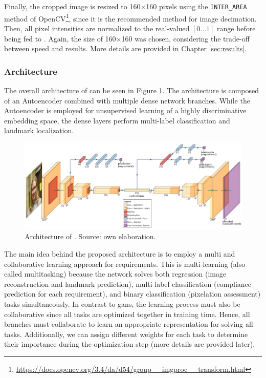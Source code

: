 Finally, the cropped image is resized to 160$\times$160 pixels using the \texttt{INTER\_AREA} method of OpenCV\footnote{\url{https://docs.opencv.org/3.4/da/d54/group__imgproc__transform.html}}, since it is the recommended method for image decimation. Then, all pixel intensities are normalized to the real-valued $[0...1]$ range before being fed to \methodname. Again, the size of 160$\times$160 was chosen, considering the trade-off between speed and results. More details are provided in Chapter \ref{sec:results}. 
 
\subsubsection{Architecture}
 
The overall architecture of \methodname can be seen in Figure \ref{fig:icaonet}. The architecture is composed of an Autoencoder combined with multiple dense network branches. While the Autoencoder is employed for unsupervised learning of a highly discriminative embedding space, the dense layers perform multi-label classification and landmark localization.
 
\begin{figure}[tb]
\centering
\includegraphics[width=\linewidth]{images/icaonet/icaonet.pdf}
\caption{Architecture of \methodname. Source: own elaboration.}
\label{fig:icaonet}
\end{figure}
 
The main idea behind the proposed architecture is to employ a multi and collaborative learning approach for \icao requirements. This is multi-learning (also called multitasking) because the network solves both regression (image reconstruction and landmark prediction), multi-label classification (compliance prediction for each requirement), and binary classification (pixelation assessment) tasks simultaneously. In contrast to \acfp{gan}, the learning process must also be collaborative since all tasks are optimized together in training time. Hence, all branches must collaborate to learn an appropriate representation for solving all tasks. Additionally, we can assign different weights for each task to determine their importance during the optimization step (more details are provided later).
 
